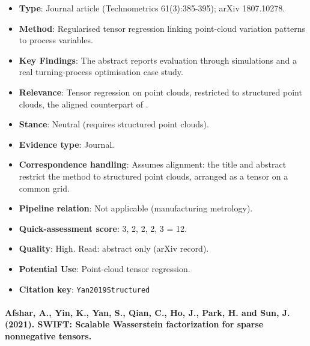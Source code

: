 \documentclass[journal,onecolumn]{IEEEtran}
\begin{document}
\begin{itemize}

\item{} \textbf{Type}: Journal article (Technometrics 61(3):385-395); arXiv 1807.10278.

\item{} \textbf{Method}: Regularised tensor regression linking point-cloud variation patterns to process variables.

\item{} \textbf{Key Findings}: The abstract reports evaluation through simulations and a real turning-process optimisation case study.

\item{} \textbf{Relevance}: Tensor regression on point clouds, restricted to structured point clouds, the aligned counterpart of \cite{Biehler2024ANTLER}.

\item{} \textbf{Stance}: Neutral (requires structured point clouds).

\item{} \textbf{Evidence type}: Journal.

\item{} \textbf{Correspondence handling}: Assumes alignment: the title and abstract restrict the method to structured point clouds, arranged as a tensor on a common grid.

\item{} \textbf{Pipeline relation}: Not applicable (manufacturing metrology).

\item{} \textbf{Quick-assessment score}: 3, 2, 2, 2, 3 = 12.

\item{} \textbf{Quality}: High. Read: abstract only (arXiv record).

\item{} \textbf{Potential Use}: Point-cloud tensor regression.

\item{} \textbf{Citation key}: \texttt{Yan2019Structured}

\end{itemize}

\paragraph{Afshar, A., Yin, K., Yan, S., Qian, C., Ho, J., Park, H. and Sun, J. (2021). SWIFT: Scalable Wasserstein factorization for sparse nonnegative tensors.~\cite{Afshar2021SWIFT}}\mbox{}
\end{document}
